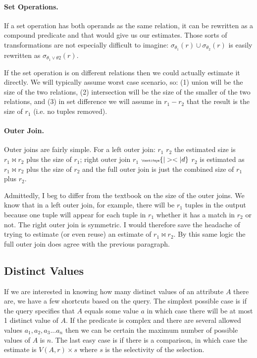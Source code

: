 \paragraph{Set Operations.}

If a set operation has both operands as the same relation, it can be rewritten as a compound predicate and that would give us our estimates. Those sorts of transformations are not especially difficult to imagine: $\sigma_{\theta_{1}}(r) \cup \sigma_{\theta_{2}}(r)$ is easily rewritten as $\sigma_{\theta_{1} \vee \theta{2}}(r)$. 

If the set operation is on different relations then we could actually estimate it directly. We will typically assume worst case scenario, so: (1) union will be the size of the two relations, (2) intersection will be the size of the smaller of the two relations, and (3) in set difference we will assume in $r_{1} - r_{2}$ that the result is the size of $r_{1}$ (i.e. no tuples removed). 


\paragraph{Outer Join.} Outer joins are fairly simple. For a left outer join: $r_{1}$ {\tiny {}} $r_{2}$ the estimated size is $r_{1} \bowtie r_{2}$ plus the size of $r_{1}$; right outer join $r_{1}$ ${\tiny \textifsym{|><|d}}$ $r_{2}$ is estimated as $r_{1} \bowtie r_{2}$ plus the size of $r_{2}$ and the full outer join {\tiny {}} is just the combined size of $r_{1}$ plus $r_{2}$.

Admittedly, I beg to differ from the textbook on the size of the outer joins. We know that in a left outer join, for example, there will be $r_{1}$ tuples in the output because one tuple will appear for each tuple in $r_{1}$ whether it has a match in $r_{2}$ or not. The right outer join is symmetric. I would therefore save the headache of trying to estimate (or even reuse) an estimate of $r_{1} \bowtie r_{2}$. By this same logic the full outer join does agree with the previous paragraph.

\subsection*{Distinct Values}

If we are interested in knowing how many distinct values of an attribute $A$ there are, we have a few shortcuts based on the query. The simplest possible case is if the query specifies that $A$ equals some value $a$ in which case there will be at most 1 distinct value of $A$. If the predicate is complex and there are several allowed values $a_{1}, a_{2}, a_{3}... a_{n}$ then we can be certain the maximum number of possible values of $A$ is $n$. The last easy case is if there is a comparison, in which case the estimate is $V(A,r) \times s$ where $s$ is the selectivity of the selection.


